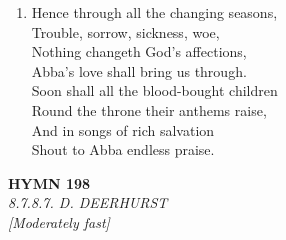 \begin{enumerate}
    \item Hence through all the changing seasons, \\
        Trouble, sorrow, sickness, woe, \\
        Nothing changeth God's affections, \\
        Abba's love shall bring us through. \\
        Soon shall all the blood-bought children \\
        Round the throne their anthems raise, \\
        And in songs of rich salvation \\
        Shout to Abba endless praise.

\end{enumerate}

\newpage
\begin{center}
    {\Large \textbf{HYMN 198}}
    \\
    \textit{8.7.8.7. D. DEERHURST}
    \\
    \textit{\small [Moderately fast]}
\end{center}
\vspace{1em}

